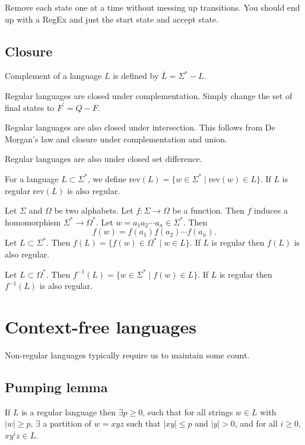 \documentclass{article}
\begin{document}
Remove each state one at a time without messing up transitions. You should end up with a RegEx and just the start state and accept state.

\subsection{Closure}

Complement of a language $L$ is defined by $\bar{L} = \Sigma^{*} - L$.

Regular languages are closed under complementation. Simply change the set of final states to $F^{\prime} = Q-F$.

Regular languages are also closed under intersection. This follows from De Morgan's law and closure under complementation and union.

Regular languages are also under closed set difference.

For a language $L \subset \Sigma^{*}$, we define rev$(L) = \{ w \in \Sigma^{*} \mid \text{rev}(w) \in L\}$. If $L$ is regular rev$(L)$ is also regular.

Let $\Sigma$ and $\Omega$ be two alphabets. Let $f: \Sigma \to \Omega$ be a function. Then $f$ induces a homomorphism $\Sigma^{*} \to \Omega^{*}$. Let $w = a_1a_2\cdots a_n \in \Sigma^{*}$. Then 
\begin{displaymath}
f(w) = f(a_1)f(a_2)\cdots f(a_n).
\end{displaymath}
Let $L \subset \Sigma^{*}$. Then $f(L) = \{ f(w) \in \Omega^{*}\mid w \in L\}$. If $L$ is regular then $f(L)$ is also regular.

Let $L \subset \Omega^{*}$. Then $f^{-1}(L) = \{w \in \Sigma^{*} \mid f(w) \in L\}$. If $L$ is regular then $f^{-1}(L)$ is also regular.

\section{Context-free languages}

Non-regular languages typically require us to maintain some count.

\subsection{Pumping lemma}

If $L$ is a regular language then $\exists p \geq 0$, such that for all strings $w\in L$ with $|w| \geq p$, $\exists $ a partition of $w = xyz$ such that $|xy| \leq p$ and $|y| > 0$, and for all $i \geq 0$, $xy^iz \in L$.
\end{document}

